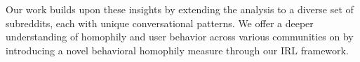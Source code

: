 Our work builds upon these insights by extending the analysis to a diverse set of subreddits, each with unique conversational patterns. We offer a deeper understanding of homophily and user behavior across various communities on \reddit by introducing a novel behavioral homophily measure through our IRL framework. %